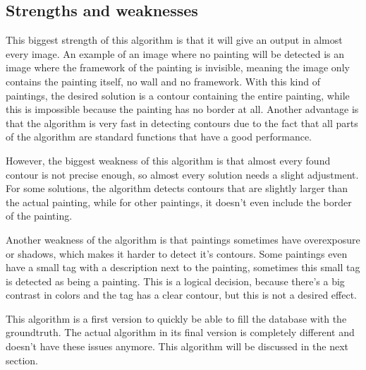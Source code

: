\subsection{Strengths and weaknesses}

This biggest strength of this algorithm is that it will give an output in almost every image. An example of an image where no painting will be detected is an image where the framework of the painting is invisible, meaning the image only contains the painting itself, no wall and no framework. With this kind of paintings, the desired solution is a contour containing the entire painting, while this is impossible because the painting has no border at all. Another advantage is that the algorithm is very fast in detecting contours due to the fact that all parts of the algorithm are standard functions that have a good performance.

However, the biggest weakness of this algorithm is that almost every found contour is not precise enough, so almost every solution needs a slight adjustment. For some solutions, the algorithm detects contours that are slightly larger than the actual painting, while for other paintings, it doesn't even include the border of the painting.

Another weakness of the algorithm is that paintings sometimes have overexposure or shadows, which makes it harder to detect it's contours. Some paintings even have a small tag with a description next to the painting, sometimes this small tag is detected as being a painting. This is a logical decision, because there's a big contrast in colors and the tag has a clear contour, but this is not a desired effect.

This algorithm is a first version to quickly be able to fill the database with the groundtruth. The actual algorithm in its final version is completely different and doesn't have these issues anymore. This algorithm will be discussed in the next section.
